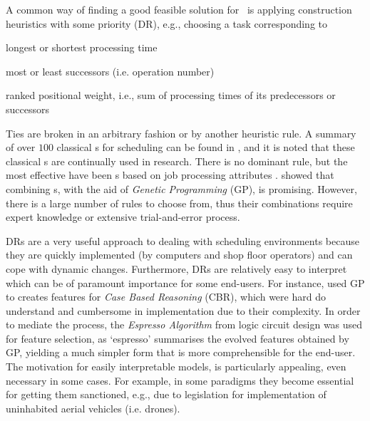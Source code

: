 A common way of finding a good feasible solution for \JSP\ is 
applying construction heuristics with some priority \emph{\dr} (DR), e.g., 
choosing a task corresponding to
\begin{enumerate*}[itemjoin*={{, or }}]
  \item longest or shortest processing time
  \item most or least successors (i.e. operation number)
  \item ranked positional weight, i.e., sum of processing times of its 
  predecessors or successors
\end{enumerate*} 
Ties are broken in an arbitrary fashion or by another heuristic rule.
A summary of over $100$ classical \dr s for scheduling can be found in 
\citet{Panwalkar77}, and it is noted that these classical \dr s are continually 
used in research.  
There is no dominant rule, but the most effective have been \sdr s based on job 
processing attributes \citep{Haupt89}. \citet{Tay08} showed that combining \dr 
s, with the aid of \emph{Genetic Programming} (GP), is promising. However, 
there is a large number of rules to choose from, thus their combinations 
require expert knowledge or extensive trial-and-error process.

DRs are a very useful approach to dealing with scheduling 
environments because they are quickly implemented (by computers and shop floor 
operators) and can cope with dynamic changes. 
Furthermore, DRs are relatively easy to interpret which can be of paramount 
importance for some end-users.
For instance, \citet{Keane15} used GP to creates features 
for \emph{Case Based Reasoning} (CBR), which were hard do understand and 
cumbersome in 
implementation due to their complexity. In order to mediate the process, the 
\emph{Espresso Algorithm}  from logic circuit design was used for feature 
selection,  as `espresso' summarises the evolved features obtained by GP, 
yielding a much simpler form that is more comprehensible for the end-user.
The motivation for easily interpretable models, is particularly appealing, 
even necessary in some cases. For example, in some paradigms they become 
essential for getting them sanctioned, e.g., due to legislation for 
implementation of uninhabited aerial vehicles (i.e. drones).

